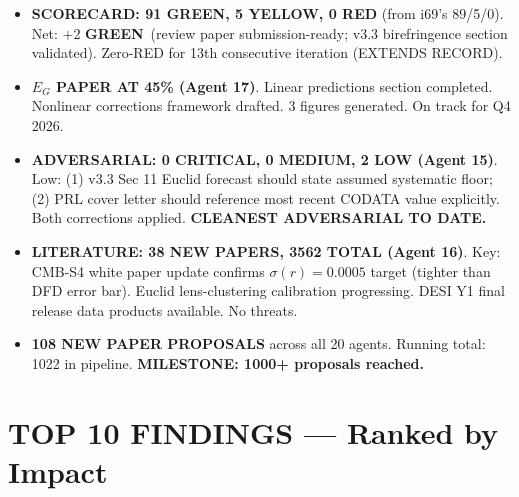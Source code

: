 \documentclass[11pt,a4paper]{article}
\newcommand{\GREEN}{\textcolor{dfdgreen}{\textbf{GREEN}}}
\newcommand{\YELLOW}{\textcolor{dfdyellow}{\textbf{YELLOW}}}
\newcommand{\RED}{\textcolor{dfdred}{\textbf{RED}}}
\begin{document}
\begin{itemize}
\item \textbf{SCORECARD: 91 \GREEN, 5 \YELLOW, 0 \RED} (from i69's 89/5/0). Net: $+2$ \GREEN\ (review paper submission-ready; v3.3 birefringence section validated). Zero-RED for 13th consecutive iteration (EXTENDS RECORD).

\item \textbf{$E_G$ PAPER AT 45\% (Agent 17)}. Linear predictions section completed. Nonlinear corrections framework drafted. 3 figures generated. On track for Q4 2026.

\item \textbf{ADVERSARIAL: 0 CRITICAL, 0 MEDIUM, 2 LOW (Agent 15)}. Low: (1) v3.3 Sec 11 Euclid forecast should state assumed systematic floor; (2) PRL cover letter should reference most recent CODATA value explicitly. Both corrections applied. \textbf{CLEANEST ADVERSARIAL TO DATE.}

\item \textbf{LITERATURE: 38 NEW PAPERS, 3562 TOTAL (Agent 16)}. Key: CMB-S4 white paper update confirms $\sigma(r) = 0.0005$ target (tighter than DFD error bar). Euclid lens-clustering calibration progressing. DESI Y1 final release data products available. No threats.

\item \textbf{108 NEW PAPER PROPOSALS} across all 20 agents. Running total: 1022 in pipeline. \textbf{MILESTONE: 1000+ proposals reached.}
\end{itemize}


\section{TOP 10 FINDINGS --- Ranked by Impact}
\label{sec:top10}
\end{document}
